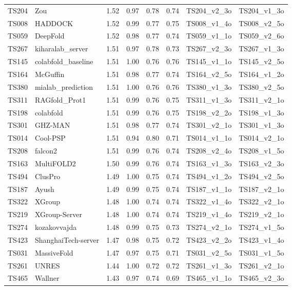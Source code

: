 \begin{longtable}{llllllll}
TS204 & Zou & 1.52 & 0.97 & 0.78 & 0.74 & TS204\_v2\_3o & TS204\_v1\_3o \\ 
TS008 & HADDOCK & 1.52 & 0.99 & 0.77 & 0.75 & TS008\_v1\_4o & TS008\_v2\_5o \\ 
TS059 & DeepFold & 1.52 & 0.98 & 0.77 & 0.74 & TS059\_v1\_1o & TS059\_v2\_6o \\ 
TS267 & kiharalab\_server & 1.51 & 0.97 & 0.78 & 0.73 & TS267\_v2\_3o & TS267\_v1\_3o \\ 
TS145 & colabfold\_baseline & 1.51 & 1.00 & 0.76 & 0.76 & TS145\_v1\_1o & TS145\_v2\_5o \\ 
TS164 & McGuffin & 1.51 & 0.98 & 0.77 & 0.74 & TS164\_v2\_5o & TS164\_v1\_2o \\ 
TS380 & mialab\_prediction & 1.51 & 1.00 & 0.76 & 0.76 & TS380\_v1\_3o & TS380\_v2\_5o \\ 
TS311 & RAGfold\_Prot1 & 1.51 & 0.99 & 0.76 & 0.75 & TS311\_v1\_3o & TS311\_v2\_1o \\ 
TS198 & colabfold & 1.51 & 0.99 & 0.76 & 0.75 & TS198\_v2\_2o & TS198\_v1\_3o \\ 
TS301 & GHZ-MAN & 1.51 & 0.98 & 0.77 & 0.74 & TS301\_v2\_1o & TS301\_v1\_3o \\ 
TS014 & Cool-PSP & 1.51 & 0.94 & 0.80 & 0.71 & TS014\_v1\_1o & TS014\_v2\_1o \\ 
TS208 & falcon2 & 1.51 & 0.99 & 0.76 & 0.74 & TS208\_v2\_4o & TS208\_v1\_5o \\ 
TS163 & MultiFOLD2 & 1.50 & 0.99 & 0.76 & 0.74 & TS163\_v1\_3o & TS163\_v2\_3o \\ 
TS494 & ClusPro & 1.49 & 1.00 & 0.75 & 0.74 & TS494\_v1\_2o & TS494\_v2\_5o \\ 
TS187 & Ayush & 1.49 & 0.99 & 0.75 & 0.74 & TS187\_v1\_1o & TS187\_v2\_1o \\ 
TS322 & XGroup & 1.48 & 1.00 & 0.74 & 0.74 & TS322\_v1\_4o & TS322\_v2\_1o \\ 
TS219 & XGroup-Server & 1.48 & 1.00 & 0.74 & 0.74 & TS219\_v1\_4o & TS219\_v2\_1o \\ 
TS274 & kozakovvajda & 1.48 & 0.99 & 0.75 & 0.73 & TS274\_v2\_1o & TS274\_v1\_5o \\ 
TS423 & ShanghaiTech-server & 1.47 & 0.98 & 0.75 & 0.72 & TS423\_v2\_2o & TS423\_v1\_4o \\ 
TS031 & MassiveFold & 1.47 & 0.97 & 0.75 & 0.71 & TS031\_v2\_5o & TS031\_v1\_5o \\ 
TS261 & UNRES & 1.44 & 1.00 & 0.72 & 0.72 & TS261\_v1\_3o & TS261\_v2\_1o \\ 
TS465 & Wallner & 1.43 & 0.97 & 0.74 & 0.69 & TS465\_v1\_1o & TS465\_v2\_3o \\ 

\end{longtable}
